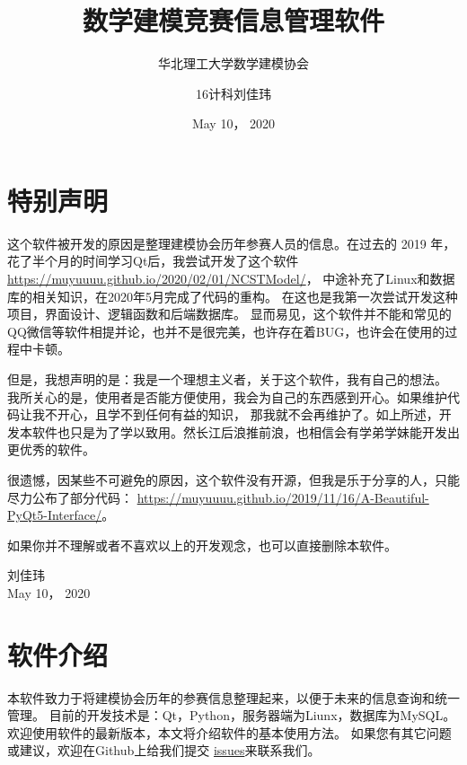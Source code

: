 \documentclass[cn, 11pt, chinese, show]{elegantbook}
\title{数学建模竞赛信息管理软件}
\subtitle{华北理工大学数学建模协会}
\author{16计科刘佳玮}
\date{May 10， 2020}
\begin{document}
\maketitle
\frontmatter

\chapter*{特别声明}

这个软件被开发的原因是整理建模协会历年参赛人员的信息。在过去的 2019 年，花了半个月的时间学习Qt后，我尝试开发了这个软件
 \href{https://muyuuuu.github.io/2020/02/01/NCSTModel/}{https://muyuuuu.github.io/2020/02/01/N\-CSTModel/}，
中途补充了Linux和数据库的相关知识，在2020年5月完成了代码的重构。
在这也是我第一次尝试开发这种项目，界面设计、逻辑函数和后端数据库。
显而易见，这个软件并不能和常见的QQ微信等软件相提并论，也并不是很完美，也许存在着BUG，也许会在使用的过程中卡顿。

但是，我想声明的是：我是一个理想主义者，关于这个软件，我有自己的想法。
我所关心的是，使用者是否能方便使用，我会为自己的东西感到开心。如果维护代码让我不开心，且学不到任何有益的知识，
那我就不会再维护了。如上所述，开发本软件也只是为了学以致用。然长江后浪推前浪，也相信会有学弟学妹能开发出更优秀的软件。

很遗憾，因某些不可避免的原因，这个软件没有开源，但我是乐于分享的人，只能尽力公布了部分代码：
\href{https://muyuuuu.github.io/2019/11/16/A-Beautiful-PyQt5-Interface/}{https://muyuuuu.github.io/2019/11/16/A-Beautiful-PyQt5-Interface/}。

如果你并不理解或者不喜欢以上的开发观念，也可以直接删除本软件。

\vskip 1.5cm

\begin{flushright}
刘佳玮\\
May 10， 2020
\end{flushright}

\tableofcontents

\mainmatter
\chapter{软件介绍}

本软件致力于将建模协会历年的参赛信息整理起来，以便于未来的信息查询和统一管理。
目前的开发技术是：Qt，Python，服务器端为Liunx，数据库为MySQL。欢迎使用软件的最新版本，本文将介绍软件的基本使用方法。
如果您有其它问题或建议，欢迎在Github上给我们提交
 \href{https://github.com/muyuuuu/NCST-MMA-Contest-Management-System-Public}{issues}来联系我们。
\end{document}
